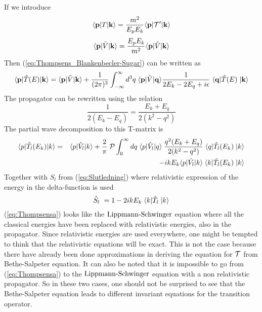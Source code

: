 If we introduce
\begin{equation}\label{eq:Thops_T_Blankenbecler-Sugar}
\braketm{{\bf p}}{T}{{\bf k}}=\frac{m^2}{{{E_pE_k}}}\braketm{{\bf p}}{{\cal{T}}'}{{\bf k}}
\end{equation}
\begin{equation}\label{eq:Thops_pot_Blankenbecler-Sugar}
\braketm{{\bf p}} {\bar{V}}{{\bf k}}=\frac{{{E_pE_k}}}{m^2}\braketm{{\bf p}} {\op{V}}{{\bf k}}
\end{equation}
%
Then (\ref{eq:Thompsens_Blankenbecler-Sugar}) can be written as
\begin{equation}\label{eq:Thompsensa}
\braketm{{\bf p}} {\op{{ T}}(E)}{{\bf k}} =\braketm{{\bf p}}{\op{V}}{{\bf k}}
+ \inv{(2\pi)^3}\int^{\infty}_{-\infty}d^3 { q}\;\bra{{\bf p}}\op{V}\ket{{\bf q}}
\inv{2E_k-2E_q+i\epsilon}   \;\bra{{\bf q}} \op{{ T}}(E)\;\ket{{\bf k}}
\end{equation}
%
The propagator can be rewritten using the relation
\begin{equation}
\frac{1}{2(E_k-E_q)}=\frac{E_k+E_q}{2(k^2-q^2)}
\end{equation}
The partial wave decomposition to this T-matrix is
\begin{eqnarray}\label{eq:Trelllllhei}
\braketm{{ p}} {\op{T}_l(E_{ k})}{{ k}}&=&\braketm{{ p}}{\op{V}_l}{{ k}}
+ \frac{2}{\pi}\;{\cal P}\int^{\infty}_{0}d { q}\;\bra{{ p}}\op{V}_l\ket{{ q}}
\; \frac{q^2(E_k+E_q)}{2(k^2-q^2)}   \;\bra{{ q}} \op{T}_l(E_{ k})\;\ket{{ k}}\nonumber\\
&&
-i { k}E_k \bra{{ p}}\op{V_l}\ket{{ k}}
\;\bra{{ k}}\op{T}_l(E_{ k})\;\ket{{ k}}
\end{eqnarray}
Together with $S_l$ from (\ref{eq:Slutledning}) where relativistic expression of the energy in the delta-function is used
\begin{equation}\label{eq:Sl23}
\op{S}_{l}\ =1-2ikE_{k}\;\bra{k}\op{T}_{l}\;\ket{{ k}}
\end{equation}
%
(\ref{eq:Thompsensa}) looks like the $\text{Lippmann-Schwinger}$ equation where all the classical energies have been replaced with relativistic energies,
also in the propagator.
Since relativistic energies are used everywhere,
one might be tempted to think that the relativistic equations will be exact. This is not the case because there have
already been done approximations in
deriving the equation for ${\cal T}$ from Bethe-Salpeter equation.
%
It can also be noted that it is impossible to go from
(\ref{eq:Thompsensa}) to the $\text{Lippmann-Schwinger}$ equation with a non relativistic propagator. So in these two cases, one should not be
surprised to see that
the Bethe-Salpeter equation leads to different invariant equations for the transition operator.
%

